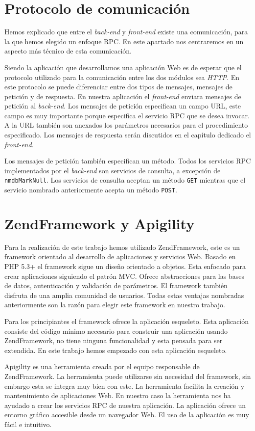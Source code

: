 \section{Protocolo de comunicación}
	Hemos explicado que entre el \emph{back-end} y \emph{front-end} existe una comunicación, para la que hemos elegido un enfoque RPC. En este
	apartado nos centraremos en un aspecto más técnico de esta comunicación. 
	\par
	Siendo la aplicación que desarrollamos una aplicación Web es de esperar que el protocolo utilizado para la comunicación entre los dos módulos
	sea \emph{HTTP}. En este protocolo se puede diferenciar entre dos tipos de mensajes, mensajes de petición y de respuesta. En nuestra
	aplicación el \emph{front-end} enviara mensajes de petición al \emph{back-end}. Los mensajes de petición especifican un campo URL, este campo
	es muy importante porque especifica el servicio RPC que se desea invocar. A la URL también son anexados los parámetros necesarios para el
	procedimiento especificado. Los mensajes de respuesta serán discutidos en el capítulo dedicado el \emph{front-end}.
	\par
	Los mensajes de petición también especifican un método. Todos los servicios RPC implementados por el \emph{back-end} son servicios de
	consulta, a excepción de \texttt{nmdbMarkNull}. Los servicios de consulta aceptan un método \texttt{GET} mientras que el servicio
	nombrado anteriormente acepta un método \texttt{POST}.
\section{ZendFramework y Apigility}
	Para la realización de este trabajo hemos utilizado ZendFramework, este es un framework orientado al desarrollo de aplicaciones y servicios Web.
	Basado en PHP 5.3+ el framework sigue un diseño orientado a objetos. Esta enfocado para crear aplicaciones siguiendo el patrón MVC. Ofrece
	abstracciones para las bases de datos, autenticación y validación de parámetros. El framework también disfruta de una amplia comunidad de 
	usuarios. Todas estas ventajas nombradas anteriormente son la razón para elegir este framework en nuestro trabajo.
	\par
 	Para  los principiantes el framework ofrece la aplicación esqueleto. Esta aplicación consiste del código mínimo necesario para construir una
	aplicación usando ZendFramework, no tiene ninguna funcionalidad y esta pensada para ser extendida. En este trabajo hemos empezado con esta
	aplicación esqueleto.
  	\par
	Apigility es una herramienta creada por el equipo responsable de ZendFramework. La herramienta puede utilizarse sin necesidad del framework,
	sin embargo esta se integra muy bien con este. La herramienta facilita la creación y mantenimiento de aplicaciones Web. En nuestro caso la
	herramienta nos ha ayudado a crear los servicios RPC de nuestra aplicación. La aplicación ofrece un entorno gráfico accesible desde un navegador
	Web. El uso de la aplicación es muy fácil e intuitivo.
